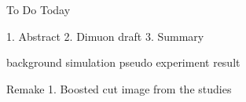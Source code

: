 To Do Today

1. Abstract
2. Dimuon draft 
3. Summary

background simulation pseudo experiment result


Remake
1. Boosted cut image from the studies

